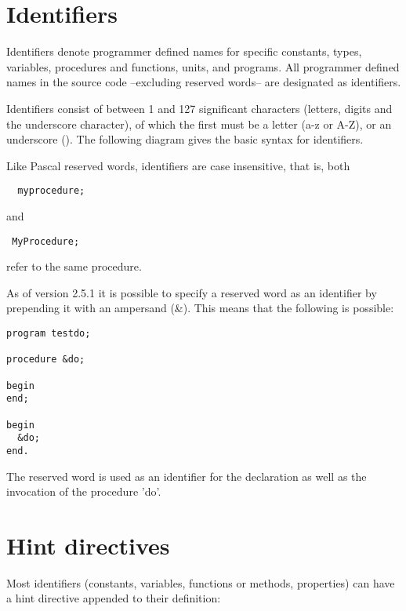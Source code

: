 \section{Identifiers}
\label{se:identifiers}
Identifiers denote programmer defined names for specific constants, types,
variables, procedures and functions, units, and programs. All programmer 
defined names in the source code --excluding reserved words-- are designated as
identifiers. 

Identifiers consist of between 1 and 127 significant characters (letters, digits and
the underscore character), of which the first must be a letter (a-z or A-Z), 
or an underscore (\var{\_}).
The following diagram gives the basic syntax for identifiers.

Like Pascal reserved words, identifiers are case insensitive, that is, both
\begin{verbatim}
  myprocedure;
\end{verbatim}
and
\begin{verbatim}
 MyProcedure;
\end{verbatim}
refer to the same procedure.

\begin{remark}
As of version 2.5.1 it is possible to specify a reserved word as an identifier by 
prepending it with an ampersand (\&). This means that the following is possible:
\begin{verbatim}
program testdo;

procedure &do;

begin
end;

begin
  &do;
end.
\end{verbatim}
The reserved word  is used as an identifier for the declaration as
well as the invocation of the procedure 'do'.
\end{remark}
 
\section{Hint directives}
Most identifiers (constants, variables, functions or methods, properties) can have a 
hint directive appended to their definition:

